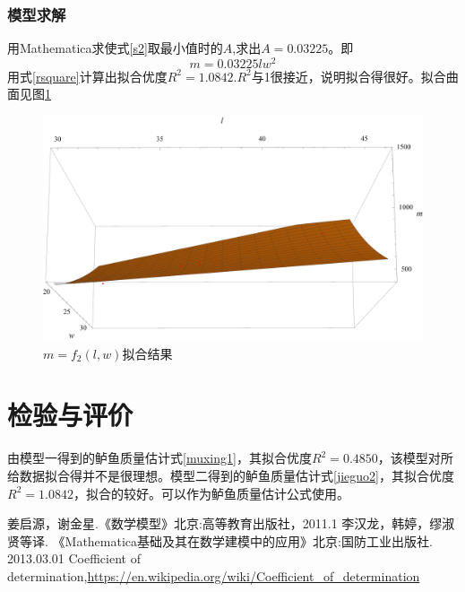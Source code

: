 \documentclass[UTF8,a4paper]{ctexart}
\numberwithin{equation}{section}%
\numberwithin{table}{section}
\numberwithin{figure}{section}
\begin{document}
\subsubsection{模型求解}
用Mathematica求使式\eqref{s2}取最小值时的$A$,求出$A=0.03225$。即
\begin{equation}
	m=0.03225lw^2
	\label{jieguo2}
\end{equation}用式\eqref{rsquare}计算出拟合优度$R^2=1.0842$.$R^2$与1很接近，说明拟合得很好。拟合曲面见图\ref{nihetu2}
\begin{figure}[!htp]
	\centering
	\includegraphics[width=15cm]{nihetu2.pdf}
	\caption{$m=f_2(l,w)$拟合结果}
	\label{nihetu2}
\end{figure}


\section{检验与评价}
由模型一得到的鲈鱼质量估计式\eqref{muxing1}，其拟合优度$R^2=0.4850$，该模型对所给数据拟合得并不是很理想。模型二得到的鲈鱼质量估计式\eqref{jieguo2}，其拟合优度$R^2=1.0842$，拟合的较好。可以作为鲈鱼质量估计公式使用。
\begin{thebibliography}{99}
	姜启源，谢金星.《数学模型》北京:高等教育出版社，2011.1
	李汉龙，韩婷，缪淑贤等译. 《Mathematica基础及其在数学建模中的应用》北京:国防工业出版社. 2013.03.01
	Coefficient of determination,\url{https://en.wikipedia.org/wiki/Coefficient_of_determination}
\end{thebibliography}
\end{document}
